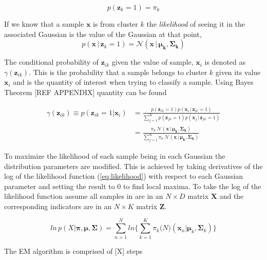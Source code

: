 \begin{equation}
	\label{eq:marginalk}
	p(\bm{z}_{k}=1) = \pi_k 
\end{equation}
	
If we know that a sample $\bm{x}$ is from cluster $k$ the \emph{likelihood} of seeing it in the associated Gaussian is the value of the Gaussian at that point,
\begin{equation}
	\label{eq:cond}
	p(\bm{x}\, |\, \bm{z}_{k} = 1) = \mathcal{N}(\bm{x}\, |\,\bm{\mu_k}, \bm{\Sigma_k})
\end{equation}

The conditional probability of $\bm{z}_{ik}$ given the value of sample, $\bm{x}_i$ is denoted as $\gamma(\bm{z}_{ik})$. This is the probability that a sample belongs to cluster $k$ given its value $\bm{x}_i$ and is the quantity of interest when trying to classify a sample.  Using Bayes Theorem [REF APPENDIX] quantity can be found 

\begin{align}
	\gamma(\bm{z}_{ik}) \equiv p(\bm{z}_{ik} =1 | \bm{x}_i)
	\label{eq:gamma2}
	&= \frac{p(\bm{z}_{ik}=1)p(\bm{x}_i\, |\, \bm{z}_{ik} = 1)}{\sum^K_{j=1}p(\bm{z}_{jk}=1)p(\bm{x}_j\, |\, \bm{z}_{jk} = 1)}\\ 
	\label{eq:gamma3}
	&= \frac{\pi_k\, \mathcal{N}(\bm{x}\,|\,\bm{\mu_k},\bm{\Sigma_k})}{\sum_{j=1}^{K}\pi_k\, \mathcal{N}(\bm{x}\,|\,\bm{\mu_k},\bm{\Sigma_k})}
\end{align}


To maximize the likelihood of each sample being in each Gaussian the distribution parameters are modified. This is achieved by taking derivatives of the log of the likelihood function (\ref{eq:likelihood}) with respect to each Gaussian parameter and setting the result to 0 to find local maxima. To take the log of the likelihood function assume all samples in are in an $N \times D$ matrix $\bm{X}$ and the corresponding indicators are in an $ N \times K$ matrix $\bm{Z}$. 

\begin{equation}
\label{eq:log}
ln\,p(X|\bm{\pi}, \bm{\mu}, \bm{\Sigma}) = \sum_{n=1}^N
ln \Bigg\{ \sum_{k=1}^K \pi_k\mathcal(N)(\bm{x}_n|\bm{\mu}_k,\bm{\Sigma}_k)\Bigg\}
\end{equation}







\centerline{}

The EM algorithm is comprised of [X] steps

